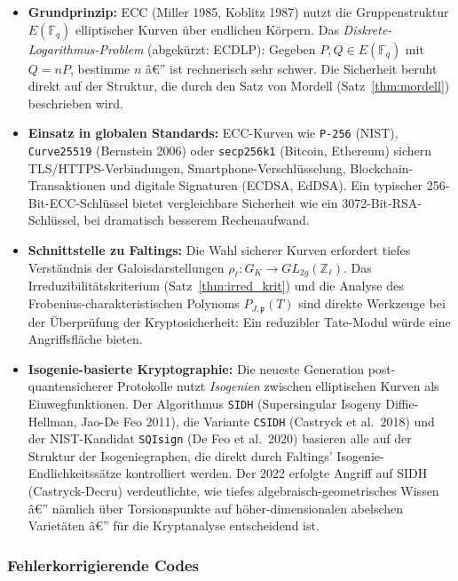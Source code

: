 ﻿\documentclass[12pt,a4paper]{article}
\theoremstyle{plain}
\theoremstyle{definition}
\theoremstyle{remark}
\newcommand{\Z}{\mathbb{Z}}
\newcommand{\F}{\mathbb{F}}
\begin{document}
\begin{itemize}[leftmargin=2em,itemsep=4pt]
  \item \textbf{Grundprinzip:}
    ECC (Miller 1985, Koblitz 1987) nutzt die Gruppenstruktur $E(\F_q)$
    elliptischer Kurven über endlichen Körpern. Das \emph{Diskrete-Logarithmus-Problem}
    (abgekürzt: ECDLP): Gegeben $P, Q \in E(\F_q)$ mit $Q = nP$, bestimme $n$ â€” ist rechnerisch
    sehr schwer. Die Sicherheit beruht direkt auf der Struktur, die durch den
    Satz von Mordell (Satz~\ref{thm:mordell}) beschrieben wird.

  \item \textbf{Einsatz in globalen Standards:}
    ECC-Kurven wie \texttt{P-256} (NIST), \texttt{Curve25519} (Bernstein 2006)
    oder \texttt{secp256k1} (Bitcoin, Ethereum) sichern
    TLS/HTTPS-Verbin\-dungen, Smartphone-Verschlüsselung, Blockchain-Transaktionen
    und digitale Signaturen (ECDSA, EdDSA).
    Ein typischer 256-Bit-ECC-Schlüssel bietet vergleichbare Sicherheit wie ein
    3072-Bit-RSA-Schlüssel, bei dramatisch besserem Rechenaufwand.

  \item \textbf{Schnittstelle zu Faltings:}
    Die Wahl sicherer Kurven erfordert tiefes Verständnis der Galoisdarstellungen
    $\rho_\ell: G_K \to GL_{2g}(\Z_\ell)$. Das Irreduzibilitätskriterium
    (Satz~\ref{thm:irred_krit}) und die Analyse des Frobenius-charakteristischen Polynoms
    $P_{J,\mathfrak p}(T)$ sind direkte Werkzeuge bei der Überprüfung der
    Kryptosicherheit: Ein reduzibler Tate-Modul würde eine Angriffsfläche bieten.

  \item \textbf{Isogenie-basierte Kryptographie:}
    Die neueste Generation post-quantensicherer Protokolle nutzt \emph{Isogenien}
    zwischen elliptischen Kurven als Einwegfunktionen. Der Algorithmus
    \texttt{SIDH} (Supersingular Isogeny Diffie-Hellman, Jao-De Feo 2011),
    die Variante \texttt{CSIDH} (Castryck et al.\ 2018) und der NIST-Kandidat
    \texttt{SQIsign} (De Feo et al.\ 2020) basieren alle auf der Struktur
    der Isogeniegraphen, die direkt durch Faltings' Isogenie-Endlichkeitssätze
    kontrolliert werden. Der 2022 erfolgte Angriff auf SIDH (Castryck-Decru)
    verdeutlichte, wie tiefes algebraisch-geometrisches Wissen â€” nämlich über
    Torsionspunkte auf höher-dimensionalen abelschen Varietäten â€” für die
    Kryptanalyse entscheidend ist.
\end{itemize}

\subsubsection{Fehlerkorrigierende Codes}
\end{document}
